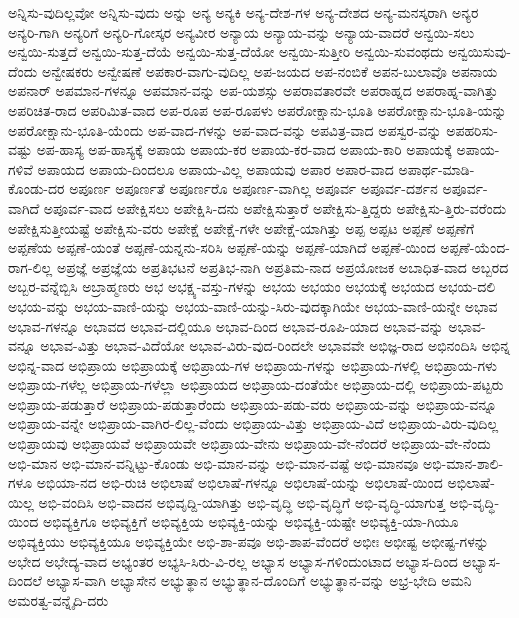 {ಅನ್ನಿಸು-ವುದಿಲ್ಲವೋ
ಅನ್ನಿಸು-ವುದು
ಅನ್ನು
ಅನ್ಯ
ಅನ್ಯಕಿ
ಅನ್ಯ-ದೇಶ-ಗಳ
ಅನ್ಯ-ದೇಶದ
ಅನ್ಯ-ಮನಸ್ಕರಾಗಿ
ಅನ್ಯರ
ಅನ್ಯರಿ-ಗಾಗಿ
ಅನ್ಯರಿಗೆ
ಅನ್ಯರಿ-ಗೋಸ್ಕರ
ಅನ್ಯವೀರ
ಅನ್ಯಾಯ
ಅನ್ಯಾಯ-ವನ್ನು
ಅನ್ಯಾಯ-ವಾದರೆ
ಅನ್ವಯಿ-ಸಲು
ಅನ್ವಯಿ-ಸುತ್ತದೆ
ಅನ್ವಯಿ-ಸುತ್ತ-ದೆಯೆ
ಅನ್ವಯಿ-ಸುತ್ತ-ದೆಯೋ
ಅನ್ವಯಿ-ಸುತ್ತೀರಿ
ಅನ್ವಯಿ-ಸುವಂಥದು
ಅನ್ವಯಿಸುವು-ದೆಂದು
ಅನ್ವೇಷಕರು
ಅನ್ವೇಷಣೆ
ಅಪಕಾರ-ವಾಗು-ವುದಿಲ್ಲ
ಅಪ-ಜಯದ
ಅಪ-ನಂಬಿಕೆ
ಅಪನ-ಬುಲಾವೊ
ಅಪನಾಯ
ಅಪನಾರ್
ಅಪಮಾನ-ಗಳನ್ನೂ
ಅಪಮಾನ-ವನ್ನು
ಅಪ-ಯಶಸ್ಸು
ಅಪರಾವತಾರವೇ
ಅಪರಾಹ್ನದ
ಅಪರಾಹ್ನ-ವಾಗಿತ್ತು
ಅಪರಿಚಿತ-ರಾದ
ಅಪರಿಮಿತ-ವಾದ
ಅಪ-ರೂಪ
ಅಪ-ರೂಪಳು
ಅಪರೋಕ್ಷಾನು-ಭೂತಿ
ಅಪರೋಕ್ಷಾನು-ಭೂತಿ-ಯನ್ನು
ಅಪರೋಕ್ಷಾನು-ಭೂತಿ-ಯೆಂದು
ಅಪ-ವಾದ-ಗಳನ್ನು
ಅಪ-ವಾದ-ವನ್ನು
ಅಪವಿತ್ರ-ವಾದ
ಅಪಸ್ವರ-ವನ್ನು
ಅಪಹರಿಸು-ವಷ್ಟು
ಅಪ-ಹಾಸ್ಯ
ಅಪ-ಹಾಸ್ಯಕ್ಕೆ
ಅಪಾಯ
ಅಪಾಯ-ಕರ
ಅಪಾಯ-ಕರ-ವಾದ
ಅಪಾಯ-ಕಾರಿ
ಅಪಾಯಕ್ಕೆ
ಅಪಾಯ-ಗಳಿವೆ
ಅಪಾಯದ
ಅಪಾಯ-ದಿಂದಲೂ
ಅಪಾಯ-ವಿಲ್ಲ
ಅಪಾಯವು
ಅಪಾರ
ಅಪಾರ-ವಾದ
ಅಪಾರ್ಥ-ಮಾಡಿ-ಕೊಂಡು-ದರ
ಅಪೂರ್ಣ
ಅಪೂರ್ಣತೆ
ಅಪೂರ್ಣರೊ
ಅಪೂರ್ಣ-ವಾಗಿಲ್ಲ
ಅಪೂರ್ವ
ಅಪೂರ್ವ-ದರ್ಶನ
ಅಪೂರ್ವ-ವಾಗಿದೆ
ಅಪೂರ್ವ-ವಾದ
ಅಪೇಕ್ಷಿಸಲು
ಅಪೇಕ್ಷಿಸಿ-ದನು
ಅಪೇಕ್ಷಿಸುತ್ತಾರೆ
ಅಪೇಕ್ಷಿಸು-ತ್ತಿದ್ದರು
ಅಪೇಕ್ಷಿಸು-ತ್ತಿರು-ವರೆಂದು
ಅಪೇಕ್ಷಿಸುತ್ತೀಯಷ್ಟೆ
ಅಪೇಕ್ಷಿಸು-ವರು
ಅಪೇಕ್ಷೆ
ಅಪೇಕ್ಷೆ-ಗಳೇ
ಅಪೇಕ್ಷೆ-ಯಾಗಿತ್ತು
ಅಪ್ಪ
ಅಪ್ಪಟ
ಅಪ್ಪಣೆ
ಅಪ್ಪಣೆಗೆ
ಅಪ್ಪಣೆಯ
ಅಪ್ಪಣೆ-ಯಂತೆ
ಅಪ್ಪಣೆ-ಯನ್ನನು-ಸರಿಸಿ
ಅಪ್ಪಣೆ-ಯನ್ನು
ಅಪ್ಪಣೆ-ಯಾಗಿದೆ
ಅಪ್ಪಣೆ-ಯಿಂದ
ಅಪ್ಪಣೆ-ಯೆಂದ-ರಾಗ-ಲಿಲ್ಲ
ಅಪ್ರಜ್ಞೆ
ಅಪ್ರಜ್ಞೆಯ
ಅಪ್ರತಿಭಟನೆ
ಅಪ್ರತಿಭ-ನಾಗಿ
ಅಪ್ರತಿಮ-ನಾದ
ಅಪ್ರಯೋಜಕ
ಅಬಾಧಿತ-ವಾದ
ಅಬ್ಬರದ
ಅಬ್ಬರ-ವನ್ನೆಬ್ಬಿಸಿ
ಅಬ್ರಾಹ್ಮಣರು
ಅಭ
ಅಭಕ್ಷ್ಯ-ವಸ್ತು-ಗಳನ್ನು
ಅಭಯ
ಅಭಯಂ
ಅಭಯಕ್ಕೆ
ಅಭಯದ
ಅಭಯ-ದಲಿ
ಅಭಯ-ವನ್ನು
ಅಭಯ-ವಾಣಿ-ಯನ್ನು
ಅಭಯ-ವಾಣಿ-ಯನ್ನು-ಸಿರು-ವುದಕ್ಕಾಗಿಯೇ
ಅಭಯ-ವಾಣಿ-ಯನ್ನೇ
ಅಭಾವ
ಅಭಾವ-ಗಳನ್ನೂ
ಅಭಾವದ
ಅಭಾವ-ದಲ್ಲಿಯೂ
ಅಭಾವ-ದಿಂದ
ಅಭಾವ-ರೂಪಿ-ಯಾದ
ಅಭಾವ-ವನ್ನು
ಅಭಾವ-ವನ್ನೂ
ಅಭಾವ-ವಿತ್ತು
ಅಭಾವ-ವಿದೆಯೋ
ಅಭಾವ-ವಿರು-ವುದ-ರಿಂದಲೇ
ಅಭಾವವೇ
ಅಭಿಜ್ಞ-ರಾದ
ಅಭಿನಂದಿಸಿ
ಅಭಿನ್ನ
ಅಭಿನ್ನ-ವಾದ
ಅಭಿಪ್ರಾಯ
ಅಭಿಪ್ರಾಯಕ್ಕೆ
ಅಭಿಪ್ರಾಯ-ಗಳ
ಅಭಿಪ್ರಾಯ-ಗಳನ್ನು
ಅಭಿಪ್ರಾಯ-ಗಳಲ್ಲಿ
ಅಭಿಪ್ರಾಯ-ಗಳು
ಅಭಿಪ್ರಾಯ-ಗಳೆಲ್ಲ
ಅಭಿಪ್ರಾಯ-ಗಳೆಲ್ಲಾ
ಅಭಿಪ್ರಾಯದ
ಅಭಿಪ್ರಾಯ-ದಂತೆಯೇ
ಅಭಿಪ್ರಾಯ-ದಲ್ಲಿ
ಅಭಿಪ್ರಾಯ-ಪಟ್ಟರು
ಅಭಿಪ್ರಾಯ-ಪಡುತ್ತಾರೆ
ಅಭಿಪ್ರಾಯ-ಪಡುತ್ತಾರೆಂದು
ಅಭಿಪ್ರಾಯ-ಪಡು-ವರು
ಅಭಿಪ್ರಾಯ-ವನ್ನು
ಅಭಿಪ್ರಾಯ-ವನ್ನೂ
ಅಭಿಪ್ರಾಯ-ವನ್ನೇ
ಅಭಿಪ್ರಾಯ-ವಾಗಿರ-ಲಿಲ್ಲ-ವೆಂದು
ಅಭಿಪ್ರಾಯ-ವಿತ್ತು
ಅಭಿಪ್ರಾಯ-ವಿದೆ
ಅಭಿಪ್ರಾಯ-ವಿರು-ವುದಿಲ್ಲ
ಅಭಿಪ್ರಾಯವು
ಅಭಿಪ್ರಾಯವೆ
ಅಭಿಪ್ರಾಯವೇ
ಅಭಿಪ್ರಾಯ-ವೇನು
ಅಭಿಪ್ರಾಯ-ವೇ-ನೆಂದರೆ
ಅಭಿಪ್ರಾಯ-ವೇ-ನೆಂದು
ಅಭಿ-ಮಾನ
ಅಭಿ-ಮಾನ-ವನ್ನಿಟ್ಟು-ಕೊಂಡು
ಅಭಿ-ಮಾನ-ವನ್ನು
ಅಭಿ-ಮಾನ-ವಷ್ಟೆ
ಅಭಿ-ಮಾನವೂ
ಅಭಿ-ಮಾನ-ಶಾಲಿ-ಗಳೂ
ಅಭಿಯಾ-ನದ
ಅಭಿ-ರುಚಿ
ಅಭಿಲಾಷೆ
ಅಭಿಲಾಷೆ-ಗಳನ್ನೂ
ಅಭಿಲಾಷೆ-ಯನ್ನು
ಅಭಿಲಾಷೆ-ಯಿಂದ
ಅಭಿಲಾಷೆ-ಯಿಲ್ಲ
ಅಭಿ-ವಂದಿಸಿ
ಅಭಿ-ವಾದನ
ಅಭಿವೃದ್ದಿ-ಯಾಗಿತ್ತು
ಅಭಿ-ವೃದ್ಧಿ
ಅಭಿ-ವೃದ್ಧಿಗೆ
ಅಭಿ-ವೃದ್ಧಿ-ಯಾಗುತ್ತ
ಅಭಿ-ವೃದ್ಧಿ-ಯಿಂದ
ಅಭಿವ್ಯಕ್ತಿಗೂ
ಅಭಿವ್ಯಕ್ತಿಗೆ
ಅಭಿವ್ಯಕ್ತಿಯ
ಅಭಿವ್ಯಕ್ತಿ-ಯನ್ನು
ಅಭಿವ್ಯಕ್ತಿ-ಯಷ್ಟೇ
ಅಭಿವ್ಯಕ್ತಿ-ಯಾ-ಗಿಯೂ
ಅಭಿವ್ಯಕ್ತಿಯು
ಅಭಿವ್ಯಕ್ತಿಯೂ
ಅಭಿವ್ಯಕ್ತಿಯೇ
ಅಭಿ-ಶಾ-ಪವೂ
ಅಭಿ-ಶಾಪ-ವೆಂದರೆ
ಅಭೀಃ
ಅಭೀಷ್ಟ
ಅಭೀಷ್ಟ-ಗಳನ್ನು
ಅಭೇದ
ಅಭೇದ್ಯ-ವಾದ
ಅಭ್ಯಂತರ
ಅಭ್ಯಸಿ-ಸಿರು-ವಿ-ರಲ್ಲ
ಅಭ್ಯಾಸ
ಅಭ್ಯಾಸ-ಗಳಿಂದುಂಟಾದ
ಅಭ್ಯಾಸ-ದಿಂದ
ಅಭ್ಯಾಸ-ದಿಂದಲೆ
ಅಭ್ಯಾಸ-ವಾಗಿ
ಅಭ್ಯಾಸೇನ
ಅಭ್ಯುತ್ಥಾನ
ಅಭ್ಯುತ್ಥಾನ-ದೊಂದಿಗೆ
ಅಭ್ಯುತ್ಥಾನ-ವನ್ನು
ಅಭ್ರ-ಭೇದಿ
ಅಮನಿ
ಅಮರತ್ವ-ವನ್ನೈದಿ-ದರು
}

